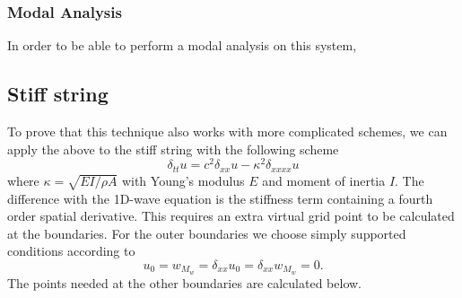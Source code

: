 \documentclass[dvipsnames]{article}
\begin{document}
        

\subsubsection{Modal Analysis}
In order to be able to perform a modal analysis on this system, 


\subsection{Stiff string}
To prove that this technique also works with more complicated schemes, we can apply the above to the stiff string with the following scheme
\begin{equation}
    \delta_{tt}u = c^2\delta_{xx}u - \kappa^2\delta_{xxxx}u
\end{equation}
where $\kappa = \sqrt{EI/\rho A}$ with Young's modulus $E$ and moment of inertia $I$. The difference with the 1D-wave equation is the stiffness term containing a fourth order spatial derivative. This requires an extra virtual grid point to be calculated at the boundaries. For the outer boundaries we choose simply supported conditions according to
\begin{equation}
    u_0 = w_{M_w} = \delta_{xx}u_0 =  \delta_{xx}w_{M_w} = 0.
\end{equation}
The points needed at the other boundaries are calculated below. 
\end{document}

